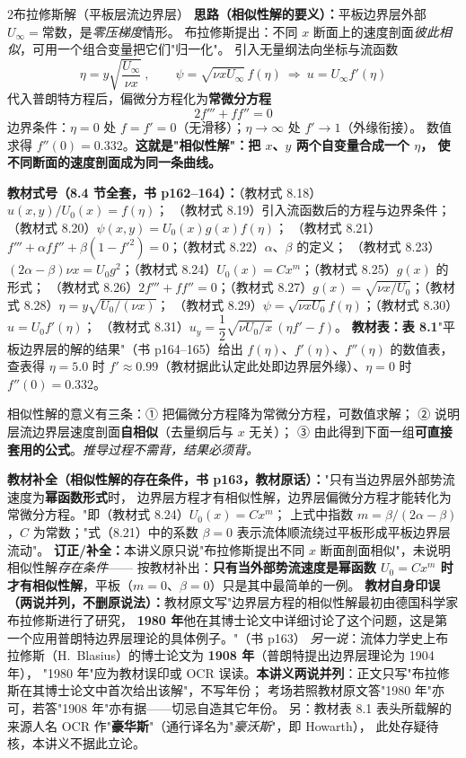 \begin{kaodian}{2}{布拉修斯解（平板层流边界层）}
\textbf{思路（相似性解的要义）：}平板边界层外部 $U_\infty=$常数，是\emph{零压梯度}情形。
布拉修斯提出：不同 $x$ 断面上的速度剖面\emph{彼此相似}，可用一个组合变量把它们"归一化"。
引入无量纲法向坐标与流函数
\[ \eta=y\sqrt{\frac{U_\infty}{\nu x}}\ ,\qquad \psi=\sqrt{\nu xU_\infty}\,f(\eta)
   \ \Longrightarrow\ u=U_\infty f'(\eta) \]
代入普朗特方程后，偏微分方程化为\textbf{常微分方程}
\[ 2f'''+ff''=0 \]
边界条件：$\eta=0$ 处 $f=f'=0$（无滑移）；$\eta\to\infty$ 处 $f'\to1$（外缘衔接）。
数值求得 $f''(0)=0.332$。\textbf{这就是"相似性解"：把 $x$、$y$ 两个自变量合成一个 $\eta$，
使不同断面的速度剖面成为同一条曲线。}

\textbf{教材式号（8.4 节全套，书 p162--164）：}（教材式 8.18）$u(x,y)/U_0(x)=f(\eta)$；
（教材式 8.19）引入流函数后的方程与边界条件；（教材式 8.20）$\psi(x,y)=U_0(x)g(x)f(\eta)$；
（教材式 8.21）$f'''+\alpha ff''+\beta(1-f'^2)=0$；（教材式 8.22）$\alpha$、$\beta$ 的定义；
（教材式 8.23）$(2\alpha-\beta)\nu x=U_0g^2$；（教材式 8.24）$U_0(x)=Cx^m$；（教材式 8.25）$g(x)$ 的形式；
（教材式 8.26）$2f'''+ff''=0$；（教材式 8.27）$g(x)=\sqrt{\nu x/U_0}$；（教材式 8.28）$\eta=y\sqrt{U_0/(\nu x)}$；
（教材式 8.29）$\psi=\sqrt{\nu xU_0}f(\eta)$；（教材式 8.30）$u=U_0f'(\eta)$；
（教材式 8.31）$u_y=\dfrac12\sqrt{\nu U_0/x}\,(\eta f'-f)$。
\textbf{教材表：}\textbf{表 8.1}"平板边界层的解的结果"（书 p164--165）给出 $f(\eta)$、$f'(\eta)$、$f''(\eta)$ 的数值表，
查表得 $\eta=5.0$ 时 $f'\approx0.99$（教材据此认定此处即边界层外缘）、$\eta=0$ 时 $f''(0)=0.332$。

\begin{tishi}
相似性解的意义有三条：① 把偏微分方程降为常微分方程，可数值求解；
② 说明层流边界层速度剖面\textbf{自相似}（去量纲后与 $x$ 无关）；
③ 由此得到下面一组\textbf{可直接套用的公式}。\emph{推导过程不需背，结果必须背。}
\end{tishi}

\begin{tishi}
\textbf{教材补全（相似性解的存在条件，书 p163，教材原话）：}"只有当边界层外部势流速度为\textbf{幂函数形式}时，
边界层方程才有相似性解，边界层偏微分方程才能转化为常微分方程。"即（教材式 8.24）$U_0(x)=Cx^m$；
上式中指数 $m=\beta/(2\alpha-\beta)$，$C$ 为常数；"式（8.21）中的系数 $\beta=0$ 表示流体顺流绕过平板形成平板边界层流动"。
\textbf{订正/补全：}本讲义原只说"布拉修斯提出不同 $x$ 断面剖面相似"，未说明相似性解\emph{存在条件}——
按教材补出：\textbf{只有当外部势流速度是幂函数 $U_0=Cx^m$ 时才有相似性解}，平板（$m=0$、$\beta=0$）只是其中最简单的一例。
\textbf{教材自身印误（两说并列，不删原说法）：}教材原文写"边界层方程的相似性解最初由德国科学家布拉修斯进行了研究，
\textbf{1980 年}他在其博士论文中详细讨论了这个问题，这是第一个应用普朗特边界层理论的具体例子。"（书 p163）
\emph{另一说}：流体力学史上布拉修斯（H.~Blasius）的博士论文为 \textbf{1908 年}（普朗特提出边界层理论为 1904 年），
"1980 年"应为教材误印或 OCR 误读。\textbf{本讲义两说并列}：正文只写"布拉修斯在其博士论文中首次给出该解"，不写年份；
考场若照教材原文答"1980 年"亦可，若答"1908 年"亦有据——切忌自造其它年份。
另：教材表 8.1 表头所载解的来源人名 OCR 作"\textbf{豪华斯}"（通行译名为"\emph{豪沃斯}"，即 Howarth），
此处存疑待核，本讲义不据此立论。
\end{tishi}


\end{kaodian}
